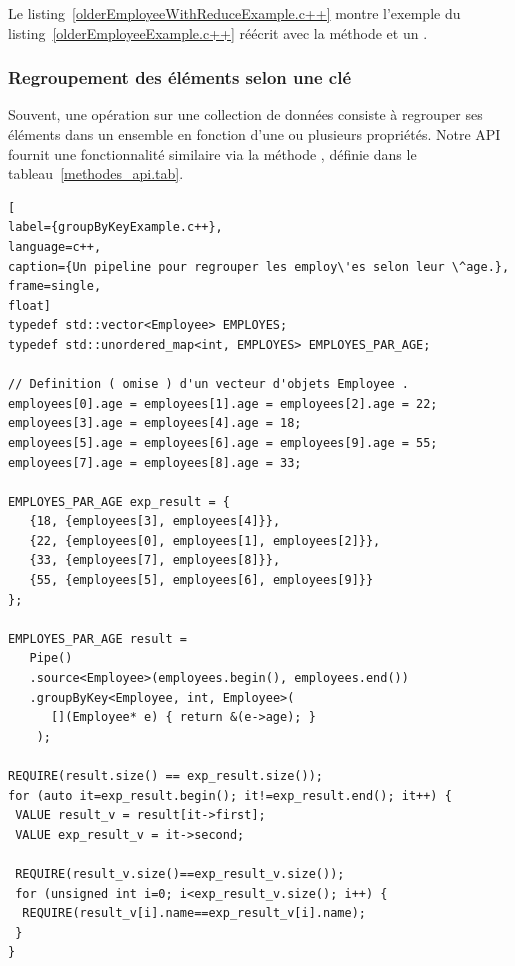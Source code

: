 Le listing~\ref{olderEmployeeWithReduceExample.c++} montre l'exemple du listing~\ref{olderEmployeeExample.c++} r\'e\'ecrit avec la m\'ethode  et un .






\subsubsection{Regroupement des \'el\'ements selon une cl\'e}

Souvent, une op\'eration sur une collection de donn\'ees consiste \`a regrouper ses \'el\'ements dans un ensemble en fonction d'une ou plusieurs propri\'et\'es. Notre {API} fournit une fonctionnalit\'e similaire via la m\'ethode , d\'efinie dans le tableau~\ref{methodes_api.tab}. 


\begin{lstlisting}[
label={groupByKeyExample.c++},
language=c++,
caption={Un pipeline pour regrouper les employ\'es selon leur \^age.},
frame=single,
float]
typedef std::vector<Employee> EMPLOYES;
typedef std::unordered_map<int, EMPLOYES> EMPLOYES_PAR_AGE;

// Definition ( omise ) d'un vecteur d'objets Employee .
employees[0].age = employees[1].age = employees[2].age = 22;
employees[3].age = employees[4].age = 18;
employees[5].age = employees[6].age = employees[9].age = 55;
employees[7].age = employees[8].age = 33;

EMPLOYES_PAR_AGE exp_result = {
   {18, {employees[3], employees[4]}},
   {22, {employees[0], employees[1], employees[2]}},
   {33, {employees[7], employees[8]}},
   {55, {employees[5], employees[6], employees[9]}}
};

EMPLOYES_PAR_AGE result = 
   Pipe()
   .source<Employee>(employees.begin(), employees.end())
   .groupByKey<Employee, int, Employee>( 
      [](Employee* e) { return &(e->age); }
    );
    
REQUIRE(result.size() == exp_result.size());
for (auto it=exp_result.begin(); it!=exp_result.end(); it++) {
 VALUE result_v = result[it->first];
 VALUE exp_result_v = it->second;

 REQUIRE(result_v.size()==exp_result_v.size());
 for (unsigned int i=0; i<exp_result_v.size(); i++) {
  REQUIRE(result_v[i].name==exp_result_v[i].name);
 }
}    
\end{lstlisting}




